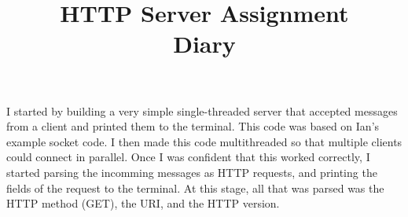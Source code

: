 \documentclass[a4paper]{article}
\title{HTTP Server Assignment \\
  \large Diary}
\date{}
\author{}
\begin{document}
\maketitle

I started by building a very simple single-threaded server that accepted
messages from a client and printed them to the terminal. This code was based on
Ian's example socket code. I then made this code multithreaded so that multiple
clients could connect in parallel. Once I was confident that this worked
correctly, I started parsing the incomming messages as HTTP requests, and
printing the fields of the request to the terminal. At this stage, all that was
parsed was the HTTP method (GET), the URI, and the HTTP version.
\end{document}
